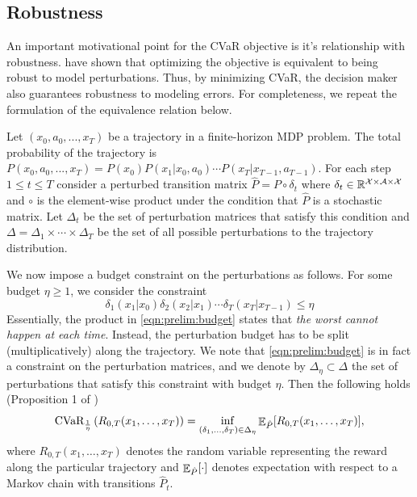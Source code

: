 \subsection{Robustness}

An important motivational point for the CVaR objective  is it's relationship with robustness. \citet{chow2015risk} have shown that optimizing the objective is equivalent to being robust to model perturbations. Thus, by minimizing CVaR, the decision maker also guarantees robustness to modeling errors. For completeness, we repeat the formulation of the equivalence relation below.

Let $(x_0, a_0, ..., x_T)$ be a trajectory in a finite-horizon MDP problem. The total probability of the trajectory is $P(x_0, a_0, ..., x_T)=P(x_0)P(x_1|x_0,a_0)\cdots P(x_T|x_{T-1}, a_{T-1})$. For each step $1\le t\le T$ consider a perturbed transition matrix $\hat{P} = P \circ \delta_t$ where $\delta_t \in \mathbb{R}^{\mathcal{X}\times\mathcal{A}\times\mathcal{X}}$ and $\circ$ is the element-wise product under the condition that $\hat{P}$ is a stochastic matrix. Let $\Delta_t$ be the set of perturbation matrices that satisfy this condition and $\Delta = \Delta_1 \times \cdots \times \Delta_T$ be the set of all possible perturbations to the trajectory distribution.

We now impose a budget constraint on the perturbations as follows. For some budget $\eta \geq 1$, we consider the constraint
\begin{equation}\label{eqn:prelim:budget}
    \delta_1(x_1|x_0)\delta_2(x_2|x_1)\cdots \delta_T(x_T|x_{T-1}) \leq \eta
\end{equation}
Essentially, the product in \eqref{eqn:prelim:budget} states that \emph{the worst cannot happen at each time}. Instead, the perturbation budget has to be split (multiplicatively) along the trajectory. We note that \eqref{eqn:prelim:budget} is in fact a constraint on the perturbation matrices, and we denote by $\Delta_\eta \subset \Delta$ the set of perturbations that satisfy this constraint with budget $\eta$.
Then the following holds (Proposition 1 of \citep{chow2015risk})
\begin{equation}\label{eq:CVaR_is_robustness}
    \text{CVaR}_{\frac{1}{\eta}} \left(R_{0,T}(x_1,\dots,x_T)\right) = \inf_{(\delta_1,\dots,\delta_T)\in \Delta_{\eta}} \mathop{\mathbb{E}}\nolimits_{\hat{P}}[R_{0,T}(x_1,\dots,x_T)],
\end{equation}
where $R_{0,T}(x_1,\dots,x_T)$ denotes the random variable representing the reward along the particular trajectory and $\mathop{\mathbb{E}}\nolimits_{\hat{P}}[\cdot]$ denotes expectation with respect to a Markov chain with transitions $\hat{P}_t$.


